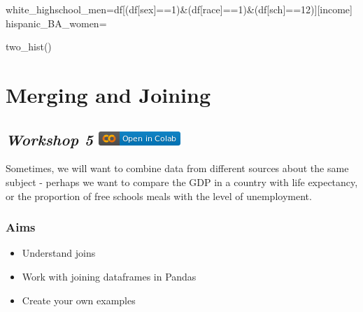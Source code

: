 \documentclass[
  letterpaper,
  DIV=11,
  numbers=noendperiod]{scrreprt}
\newenvironment{Shaded}{\begin{snugshade}}{\end{snugshade}}
\newcommand{\DecValTok}[1]{\textcolor[rgb]{0.68,0.00,0.00}{#1}}
\newcommand{\NormalTok}[1]{\textcolor[rgb]{0.00,0.23,0.31}{#1}}
\newcommand{\OperatorTok}[1]{\textcolor[rgb]{0.37,0.37,0.37}{#1}}
\newcommand{\StringTok}[1]{\textcolor[rgb]{0.13,0.47,0.30}{#1}}
\providecommand{\tightlist}{%
  \setlength{\itemsep}{0pt}\setlength{\parskip}{0pt}}\usepackage{longtable,booktabs,array}
\begin{document}
\begin{Shaded}
\begin{Highlighting}[]
\NormalTok{white\_highschool\_men}\OperatorTok{=}\NormalTok{df[(df[}\StringTok{\textquotesingle{}sex\textquotesingle{}}\NormalTok{]}\OperatorTok{==}\DecValTok{1}\NormalTok{)}\OperatorTok{\&}\NormalTok{(df[}\StringTok{\textquotesingle{}race\textquotesingle{}}\NormalTok{]}\OperatorTok{==}\DecValTok{1}\NormalTok{)}\OperatorTok{\&}\NormalTok{(df[}\StringTok{\textquotesingle{}sch\textquotesingle{}}\NormalTok{]}\OperatorTok{==}\DecValTok{12}\NormalTok{)][}\StringTok{\textquotesingle{}income\textquotesingle{}}\NormalTok{]}
\NormalTok{hispanic\_BA\_women}\OperatorTok{=}

\NormalTok{two\_hist()}
\end{Highlighting}
\end{Shaded}


\hypertarget{merging-and-joining}{%
\chapter{Merging and Joining}\label{merging-and-joining}}

\hypertarget{workshop-5-open-in-colab-1}{%
\section[\emph{Workshop 5} ]{\texorpdfstring{\emph{Workshop 5}
\href{https://colab.research.google.com/github/oballinger/QM2/blob/main/notebooks/W05.\%20Merging\%20and\%20Joining.ipynb}{\protect\includegraphics{index_files/mediabag/colab-badge.png}}}{Workshop 5 Open In Colab}}\label{workshop-5-open-in-colab-1}}

Sometimes, we will want to combine data from different sources about the
same subject - perhaps we want to compare the GDP in a country with life
expectancy, or the proportion of free schools meals with the level of
unemployment.

\hypertarget{aims-3}{%
\subsection{Aims}\label{aims-3}}

\begin{itemize}
\tightlist
\item
  Understand joins
\item
  Work with joining dataframes in Pandas
\item
  Create your own examples
\end{itemize}
\end{document}
